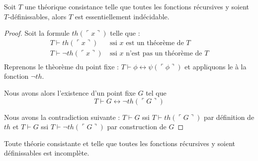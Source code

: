 \begin{theoreme}
	Soit $T$ une théorique consistance telle que toutes les fonctions récursives
	y soient $T$-définissables, alors $T$ est essentiellement indécidable.
\end{theoreme}
\begin{proof}
        Soit la formule $th(\ulcorner x \urcorner)$ telle que :
	\begin{align*}
	T \vdash th(\ulcorner x \urcorner) \ &\text{ssi $x$ est un théorème de $T$} \\
	T \vdash \neg th(\ulcorner x \urcorner) \ &\text{ssi $x$ n'est pas un théorème de $T$} \\
	\end{align*}
	Reprenons le thèorème du point fixe :
	 $ T \vdash \phi \leftrightarrow \psi (\ulcorner \phi\urcorner ) $ et appliquons le à
	 la fonction $\neg th$.
	 
	 Nous avons alors l'existence d'un point fixe $G$ tel que
	  $$T \vdash G \leftrightarrow \neg th (\ulcorner G \urcorner ) $$ 

	  Nous avons la contradiction suivante : $T \vdash G$ ssi $T \vdash th(\ulcorner G \urcorner)$ par définition de $th$
	  et $T \vdash G$ ssi $T \vdash \neg th (\ulcorner G \urcorner)$ par construction de $G$
\end{proof}

\begin{theoreme}
	Toute théorie consistante et telle que toutes les fonctions récursives y soient définissables
	est incomplète.	
\end{theoreme}


